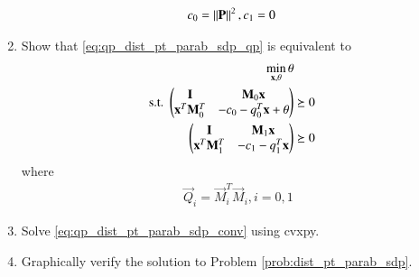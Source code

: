 \begin{enumerate}[label=\thesubsection.\arabic*.,ref=\thesubsection.\theenumi]
\begin{align}
c_0 &= \left\lVert\mathbf{P}\right\rVert^2, c_1 = 0
\end{align}
%
\item Show that \eqref{eq:qp_dist_pt_parab_sdp_qp} is equivalent to
\begin{align}
\label{eq:qp_dist_pt_parab_sdp_conv}
\begin{split}
\min_{\mathbf{x},\theta}\theta
\\
\text{s.t. } \begin{pmatrix}\mathbf{I} & \mathbf{M}_0\mathbf{x} \\ \mathbf{x}^T\mathbf{M}_0^T & -c_0-q_0^T\mathbf{x}+\theta\end{pmatrix} &\succeq 0
\\
\begin{pmatrix}\mathbf{I} & \mathbf{M}_1\mathbf{x} \\ \mathbf{x}^T\mathbf{M}_1^T & -c_1-q_1^T\mathbf{x}\end{pmatrix} &\succeq 0
\end{split}
\end{align}
%
%
where
\begin{align}
\vec{Q}_i = \vec{M}_i^T\vec{M}_i, i = 0, 1
\end{align}
%
\item Solve \eqref{eq:qp_dist_pt_parab_sdp_conv} using cvxpy.
\item Graphically verify the solution to Problem \ref{prob:dist_pt_parab_sdp}. 
%


\end{enumerate}
